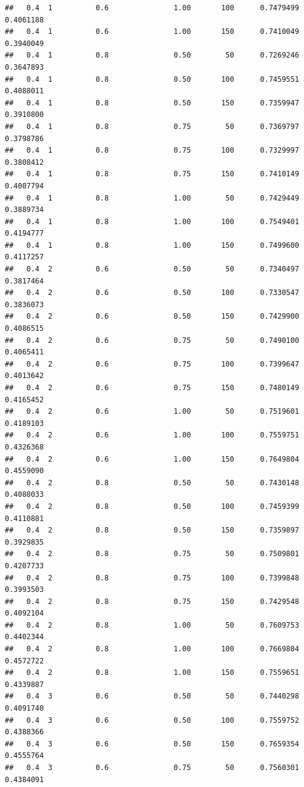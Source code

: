 \documentclass[
  spanish,
]{book}
\theoremstyle{break}
\theoremstyle{definition}
\theoremstyle{definition}
\theoremstyle{definition}
\theoremstyle{definition}
\theoremstyle{remark}
\begin{document}
\begin{verbatim}
##   0.4  1          0.6               1.00       100      0.7479499  0.4061188
##   0.4  1          0.6               1.00       150      0.7410049  0.3940049
##   0.4  1          0.8               0.50        50      0.7269246  0.3647893
##   0.4  1          0.8               0.50       100      0.7459551  0.4088011
##   0.4  1          0.8               0.50       150      0.7359947  0.3910800
##   0.4  1          0.8               0.75        50      0.7369797  0.3798786
##   0.4  1          0.8               0.75       100      0.7329997  0.3808412
##   0.4  1          0.8               0.75       150      0.7410149  0.4007794
##   0.4  1          0.8               1.00        50      0.7429449  0.3889734
##   0.4  1          0.8               1.00       100      0.7549401  0.4194777
##   0.4  1          0.8               1.00       150      0.7499600  0.4117257
##   0.4  2          0.6               0.50        50      0.7340497  0.3817464
##   0.4  2          0.6               0.50       100      0.7330547  0.3836073
##   0.4  2          0.6               0.50       150      0.7429900  0.4086515
##   0.4  2          0.6               0.75        50      0.7490100  0.4065411
##   0.4  2          0.6               0.75       100      0.7399647  0.4013642
##   0.4  2          0.6               0.75       150      0.7480149  0.4165452
##   0.4  2          0.6               1.00        50      0.7519601  0.4189103
##   0.4  2          0.6               1.00       100      0.7559751  0.4326368
##   0.4  2          0.6               1.00       150      0.7649804  0.4559090
##   0.4  2          0.8               0.50        50      0.7430148  0.4088033
##   0.4  2          0.8               0.50       100      0.7459399  0.4110881
##   0.4  2          0.8               0.50       150      0.7359897  0.3929835
##   0.4  2          0.8               0.75        50      0.7509801  0.4207733
##   0.4  2          0.8               0.75       100      0.7399848  0.3993503
##   0.4  2          0.8               0.75       150      0.7429548  0.4092104
##   0.4  2          0.8               1.00        50      0.7609753  0.4402344
##   0.4  2          0.8               1.00       100      0.7669804  0.4572722
##   0.4  2          0.8               1.00       150      0.7559651  0.4339887
##   0.4  3          0.6               0.50        50      0.7440298  0.4091740
##   0.4  3          0.6               0.50       100      0.7559752  0.4388366
##   0.4  3          0.6               0.50       150      0.7659354  0.4555764
##   0.4  3          0.6               0.75        50      0.7560301  0.4384091

\end{verbatim}
\end{document}
